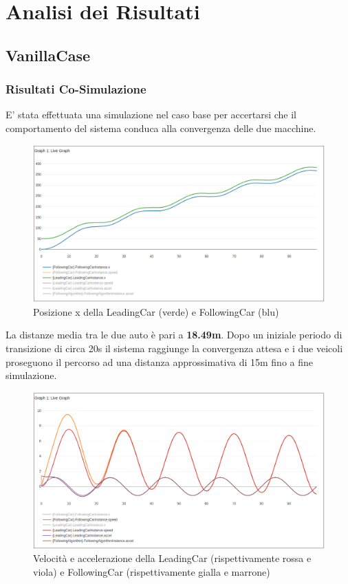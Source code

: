\section{Analisi dei Risultati}
\subsection{VanillaCase}
\subsubsection{Risultati Co-Simulazione}
E' stata effettuata una simulazione nel caso base per accertarsi che il comportamento del sistema conduca alla convergenza delle due macchine.

\begin{figure}[h]
	\centering
	\includegraphics[width=\textwidth]{img/x.png}
	\caption{Posizione x della LeadingCar (verde) e FollowingCar (blu)}
\end{figure}

La distanze media tra le due auto è pari a \textbf{18.49m}. Dopo un iniziale periodo di transizione di circa 20s il sistema raggiunge la convergenza attesa e i due veicoli proseguono il percorso ad una distanza approssimativa di 15m fino a fine simulazione.

\begin{figure}[H]
	\centering
	\includegraphics[width=\textwidth]{img/accel_speed.png}
	\caption{Velocità e accelerazione della LeadingCar (rispettivamente rossa e viola) e FollowingCar (rispettivamente gialla e marrone)}
\end{figure}

